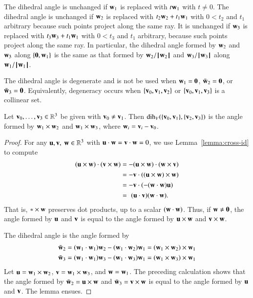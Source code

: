 \begin{remark}\label{rem:dih}
  The dihedral angle is unchanged if $\w_1$ is replaced with $t \w_1$ with
  $t\ne0$. The dihedral angle is unchanged if $\w_2$ is replaced with
  $t_2 \w_2 + t_1 \w_1$ with $0 < t_2$ and $t_1$ arbitrary because
  such points project along the same ray.  It is unchanged if $\w_3$ is
  replaced with $t_3 \w_3 + t_1 \w_1$ with $0 < t_3$ and $t_1$
  arbitrary, because such points project along the same ray.  In
  particular, the dihedral angle formed by $\w_2$ and $\w_3$ along
  $\{\orz,\w_1\}$ is the same as that formed by $\w_2/\normo{\w_2}$ and
  $\w_3/\normo{\w_3}$ along $\w_1/\normo{\w_1}$.
\end{remark}

The dihedral angle is degenerate and is not be used when $\w_1 =
\orz$, $\bar \w_2 = \orz$, or $\bar \w_3 = \orz$.  Equivalently, degeneracy
occurs when $\{\v_0,\v_1,\v_2\}$ or $\{\v_0,\v_1,\v_3\}$ is a collinear set.

\begin{lemma}\label{lemma:dih-cross}
  Let $\v_0,\ldots,\v_3\in\ring{R}^3$ be given with $\v_0\ne \v_1$.
  Then $\dih_V(\{\v_0,\v_1\},\{\v_2,\v_3\})$ is the angle formed by
  $\w_1\times \w_2$ and $\w_1\times \w_3$, where $\w_i= \v_i-\v_0$.
\end{lemma}

\begin{proof}  For any  $\u,\v,~\w\in\ring{R}^3$ with $\u\cdot\w=\v\cdot\w=0$, 
we use Lemma~\ref{lemma:cross-id}
to compute
\begin{align*}
  (\u\times \w)\cdot (\v\times \w) &= - (\u\times \w)\cdot (\w\times \v) \\
  &= -\v\cdot ((\u\times \w)\times \w) \\
  &= -\v\cdot (-(\w\cdot \w) \u)\\
  &= \,\,(\u\cdot \v) (\w\cdot \w).
\end{align*}
That is, $\wild\times \w$ preserves dot products, up to a scalar
$(\w\cdot\w)$.  Thus, if $\w\ne\orz$, the angle formed by $\u$ and
$\v$ is equal to the angle formed by $\u\times \w$ and $\v \times \w$.

The dihedral angle is the angle formed by
\begin{align*}
  \bar \w_2 & = (\w_1\cdot \w_1) \w_2 - (\w_1\cdot \w_2) \w_1 = (\w_1\times \w_2)\times \w_1\\
  \bar \w_3 & = (\w_1\cdot \w_1) \w_3 - (\w_1\cdot \w_3) \w_1 = (\w_1\times \w_3)\times \w_1
\end{align*}
Let $\u=\w_1\times \w_2$, $\v=\w_1\times \w_3$, and $\w=\w_1$.  The
preceding calculation shows that the angle formed by $\bar \w_2 =
\u\times\w$ and $\bar \w_3 = \v\times \w$ is equal to the angle formed
by $\u$ and $\v$.  The lemma ensues.
\end{proof}

